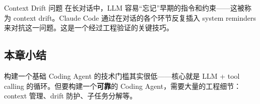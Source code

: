 \begin{warningbox}{Context Drift 问题}
在长对话中，LLM 容易``忘记''早期的指令和约束——这被称为 context drift。Claude Code 通过在对话的各个环节反复插入 system reminders 来对抗这一问题。这是一个经过工程验证的关键技巧。
\end{warningbox}

\subsection{本章小结}

构建一个基础 Coding Agent 的技术门槛其实很低——核心就是 LLM + tool calling 的循环。但要构建一个\textbf{可靠}的 Coding Agent，需要大量的工程细节：context 管理、drift 防护、子任务分解等。

